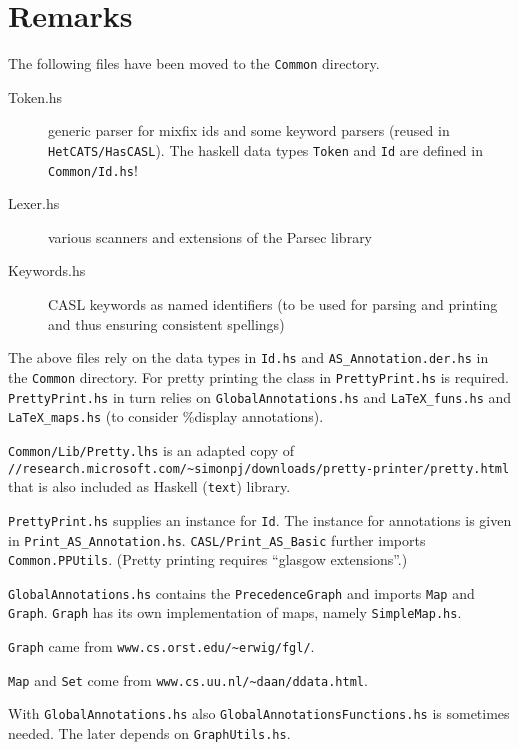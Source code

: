 \documentclass{article}
\begin{document}
\section{Remarks}

The following files have been moved to the \texttt{Common} directory.

\begin{description}
\item[Token.hs] generic parser for mixfix ids and some keyword parsers
  (reused in \texttt{HetCATS/HasCASL}). The haskell data types
  \texttt{Token} and \texttt{Id} are defined in \texttt{Common/Id.hs}!
\item[Lexer.hs] various scanners and extensions of the Parsec library 
\item[Keywords.hs] CASL keywords as named identifiers (to be used
  for parsing and printing and thus ensuring consistent spellings)
\end{description}

The above files rely on the data types in \texttt{Id.hs} and
\texttt{AS\_Annotation.der.hs} in the \texttt{Common} directory. For pretty
printing the class in \texttt{PrettyPrint.hs} is required.
\texttt{PrettyPrint.hs} in turn relies on
\texttt{GlobalAnnotations.hs} and \texttt{LaTeX\_funs.hs} and
\texttt{LaTeX\_maps.hs} (to consider \%display annotations).

\texttt{Common/Lib/Pretty.lhs} is an adapted copy of\\
\texttt{//research.microsoft.com/\~{}simonpj/downloads/pretty-printer/pretty.html}
that is also included as Haskell (\texttt{text}) library. 

\texttt{PrettyPrint.hs} supplies an instance for \texttt{Id}. The
instance for annotations is given in \texttt{Print\_AS\_Annotation.hs}.
\texttt{CASL/Print\_AS\_Basic} further imports
\texttt{Common.PPUtils}. (Pretty printing requires ``glasgow extensions''.)

\texttt{GlobalAnnotations.hs} contains the \texttt{PrecedenceGraph} and
imports \texttt{Map} and \texttt{Graph}. \texttt{Graph} has its own
implementation of maps, namely \texttt{SimpleMap.hs}.  

\texttt{Graph} came
from \texttt{www.cs.orst.edu/\~{}erwig/fgl/}.  

\texttt{Map} and \texttt{Set}
come from \texttt{www.cs.uu.nl/\~{}daan/ddata.html}.

With \texttt{GlobalAnnotations.hs} also
\texttt{GlobalAnnotationsFunctions.hs} is sometimes needed. The later
depends on \texttt{GraphUtils.hs}. 
\end{document}

